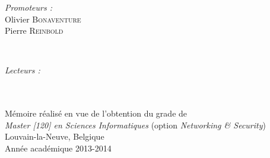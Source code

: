 \documentclass[a4paper,12pt,french]{report}
\begin{document}
\begin{titlepage}
\begin{minipage}{0.4\textwidth}
\begin{flushleft} \large
\emph{Promoteurs :} \\
Olivier \textsc{Bonaventure}\\
Pierre \textsc{Reinbold}
\end{flushleft}
\end{minipage}
~
\begin{minipage}{0.4\textwidth}
\begin{flushright} \large
\emph{Lecteurs :} \\
 \textsc{}\\
 \textsc{}
\end{flushright}
\end{minipage}\\[1.5cm]


{\normalsize Mémoire réalisé en vue de l'obtention du grade de\\
\emph{Master [120] en Sciences Informatiques} (option \emph{Networking \& Security})}\\[1.5cm]

{\normalsize Louvain-la-Neuve, Belgique}\\
{\normalsize Année académique 2013-2014}

\end{titlepage}

\pagestyle{empty} %
\tableofcontents















\end{document}

